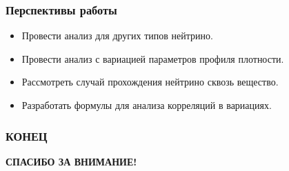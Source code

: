 \documentclass[utf8,9pt,mathserif,usepdftitle=false]{beamer}
\begin{document}
\begin{frame}
	\frametitle{Перспективы работы}
	\begin{itemize}
  \item<1-> Провести анализ для других типов нейтрино.
  \item<2-> Провести анализ с вариацией параметров профиля плотности.
  \item<3-> Рассмотреть случай прохождения нейтрино сквозь вещество. 
  \item<4-> Разработать формулы для анализа корреляций в вариациях.
	\end{itemize}
\end{frame}

\begin{frame}
  \frametitle{КОНЕЦ}%
  \LARGE\centering\bfseries
  СПАСИБО ЗА ВНИМАНИЕ!
\end{frame}
\end{document}
